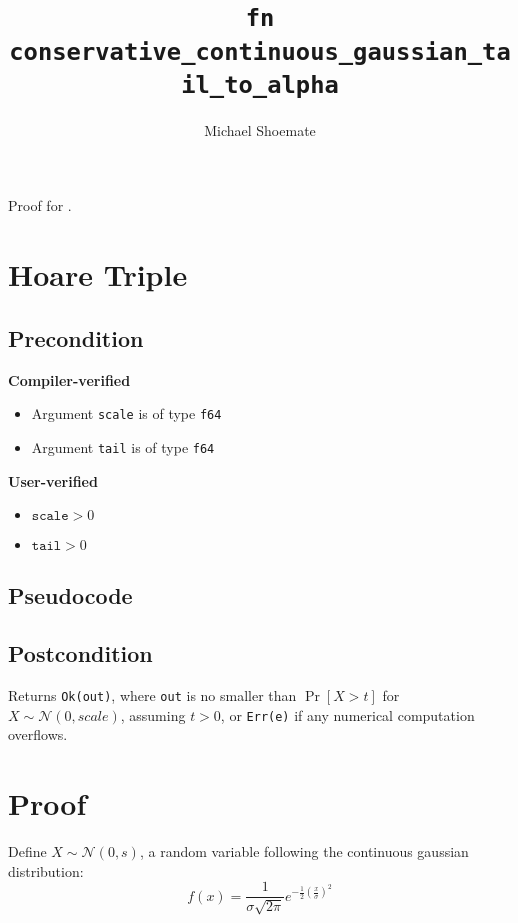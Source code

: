 \documentclass{article}
\title{\texttt{fn conservative\_continuous\_gaussian\_tail\_to\_alpha}}
\author{Michael Shoemate}
\begin{document}
 
\maketitle 
 
Proof for . 
 
 
\section{Hoare Triple} 
\subsection*{Precondition} 
 
\textbf{Compiler-verified} 
\begin{itemize} 
    \item Argument \texttt{scale} is of type \texttt{f64} 
    \item Argument \texttt{tail} is of type \texttt{f64} 
\end{itemize} 
 
\textbf{User-verified} 
\begin{itemize} 
    \item $\texttt{scale} > 0$ 
    \item $\texttt{tail} > 0$ 
\end{itemize} 
 
 
\subsection*{Pseudocode} 
 
 
\subsection*{Postcondition} 
 
Returns \texttt{Ok(out)}, where \texttt{out} is no smaller than $\Pr[X > t]$ 
for $X \sim \mathcal{N}(0, scale)$, assuming $t > 0$, 
or \texttt{Err(e)} if any numerical computation overflows. 
 
\section{Proof} 
 
\begin{definition} 
    \label{gaussian} 
    Define $X \sim \mathcal{N}(0, s)$, a random variable following the continuous gaussian distribution: 
    \begin{equation} 
        f(x) = \frac{1}{\sigma \sqrt{2 \pi}} e^{-\frac{1}{2}\left( \frac{x}{\sigma}\right)^2} 
    \end{equation} 
\end{definition} 
 
\end{document}
